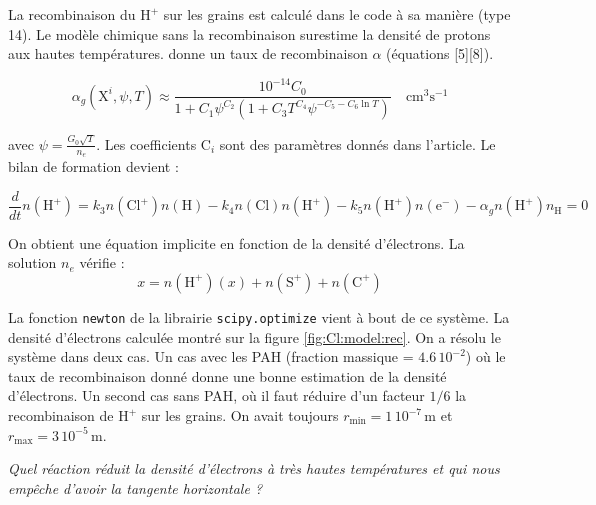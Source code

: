 La recombinaison du $\mathrm{H}^+$ sur les grains est calculé dans le code à sa manière (type 14). Le modèle chimique sans la recombinaison surestime la densité de protons aux hautes températures. \cite{Weingartner_2001} donne un taux de recombinaison $\alpha$ (équations [5][8]). 

\begin{equation}
    \alpha_{g}\left(\mathrm{X}^{i}, \psi, T\right) \approx \frac{10^{-14} C_{0} }{1+C_{1} \psi^{C_{2}}\left(1+C_{3} T^{C_{4}} \psi^{-C_{5}-C_{6} \ln T}\right)} \quad \mathrm{cm}^{3} \mathrm{s}^{-1}
\end{equation}

avec $\psi = \frac{G_0 \sqrt{T}}{n_e}$. Les coefficients $\mathrm{C}_i$ sont des paramètres donnés dans l'article. Le bilan de formation devient : 

\begin{equation}\label{eq:h+}
    \frac{d}{dt}n(\mathrm{H}^+) = k_3n(\mathrm{Cl}^+)n(\mathrm{H}) - k_4n(\mathrm{Cl})n(\mathrm{H}^+) - k_5 n(\mathrm{H}^+)n(\mathrm{e}^-) -\alpha_{g} n(\mathrm{H}^+)n_{\mathrm{H}} = 0
\end{equation}

On obtient une équation implicite en fonction de la densité d'électrons. La solution $n_e$ vérifie :
\begin{equation}
    x = n(\mathrm{H}^+)(x) + n(\mathrm{S}^+)  + n(\mathrm{C}^+)
\end{equation}

La fonction \texttt{newton} de la librairie \texttt{scipy.optimize} vient à bout de ce système. La densité d'électrons calculée montré sur la figure \ref{fig:Cl:model:rec}. On a résolu le système dans deux cas. Un cas avec les PAH (fraction massique = $4.6\,10^{-2}$) où le taux de recombinaison donné \cite{Weingartner_2001} donne une bonne estimation de la densité d'électrons. Un second cas sans PAH, où il faut réduire d'un facteur $1/6$ la recombinaison de $\mathrm{H}^+$ sur les grains. On avait toujours $r_{\mathrm{min}} = 1\,10^{-7}\,\mathrm{m}$ et $r_{\mathrm{max}} = 3\,10^{-5}\,\mathrm{m}$.

\textit{Quel réaction réduit la densité d'électrons à très hautes températures et qui nous empêche d'avoir la tangente horizontale ?}


